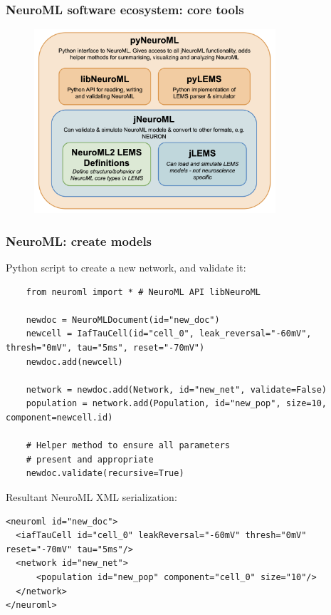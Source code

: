 \begin{frame}[c]
  \frametitle{NeuroML software ecosystem: core tools}
  \begin{figure}[h]
    \centering
    \includegraphics[width=0.8\textwidth]{99_images/software.png}
  \end{figure}
\end{frame}
\begin{frame}[fragile,c]
  \frametitle{NeuroML: create models}
  Python script to create a new network, and validate it:
    \begin{verbatim}
    from neuroml import * # NeuroML API libNeuroML

    newdoc = NeuroMLDocument(id="new_doc")
    newcell = IafTauCell(id="cell_0", leak_reversal="-60mV", thresh="0mV", tau="5ms", reset="-70mV")
    newdoc.add(newcell)

    network = newdoc.add(Network, id="new_net", validate=False)
    population = network.add(Population, id="new_pop", size=10, component=newcell.id)

    # Helper method to ensure all parameters
    # present and appropriate
    newdoc.validate(recursive=True)
    \end{verbatim}
    Resultant NeuroML XML serialization:
    \begin{verbatim}
<neuroml id="new_doc">
  <iafTauCell id="cell_0" leakReversal="-60mV" thresh="0mV" reset="-70mV" tau="5ms"/>
  <network id="new_net">
      <population id="new_pop" component="cell_0" size="10"/>
  </network>
</neuroml>
    \end{verbatim}
\end{frame}

